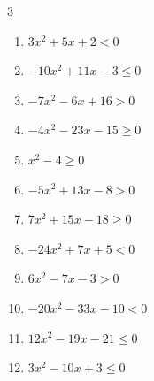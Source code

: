 \begin{multicols}{3}
\begin{enumerate}

  \item $3x^{2}+5x+2<0$


  \item $-10x^{2}+11x-3\leq 0$


  \item $-7x^{2}-6x+16>0$


  \item $-4x^{2}-23x-15\geq 0$


  \item $x^{2}-4\geq 0$

        \phantom{$\displaystyle x \leqq -2 , \; 2 \leqq x$}

\columnbreak %

\resetques

  \item $-5x^{2}+13x-8>0$


  \item $7x^{2}+15x-18\geq 0$


  \item $-24x^{2}+7x+5<0$


  \item $6x^{2}-7x-3>0$


  \item $-20x^{2}-33x-10<0$


  \item $12x^{2}-19x-21\leq 0$


  \item $3x^{2}-10x+3\leq 0$


\end{enumerate}
\end{multicols}
